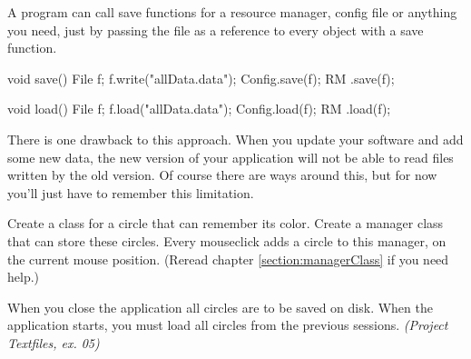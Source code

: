 A program can call save functions for a resource manager, config file or anything you need, just by passing the file as a reference to every object with a save function. 

\begin{code}
void save() {
  File f;
	f.write("allData.data");
	Config.save(f);
	RM    .save(f);
}

void load() {
	File f;
	f.load("allData.data");
	Config.load(f);
	RM    .load(f);
}
\end{code}

\begin{note}
There is one drawback to this approach. When you update your software and add some new data, the new version of your application will not be able to read files written by the old version. Of course there are ways around this, but for now you'll just have to remember this limitation.
\end{note}

\begin{exercise}
Create a class for a circle that can remember its color. Create a manager class that can store these circles. Every mouseclick adds a circle to this manager, on the current mouse position. (Reread chapter \ref{section:managerClass} if you need help.)

When you close the application all circles are to be saved on disk. When the application starts, you must load all circles from the previous sessions.
\textsl{(Project Textfiles, ex. 05)}
\end{exercise}


